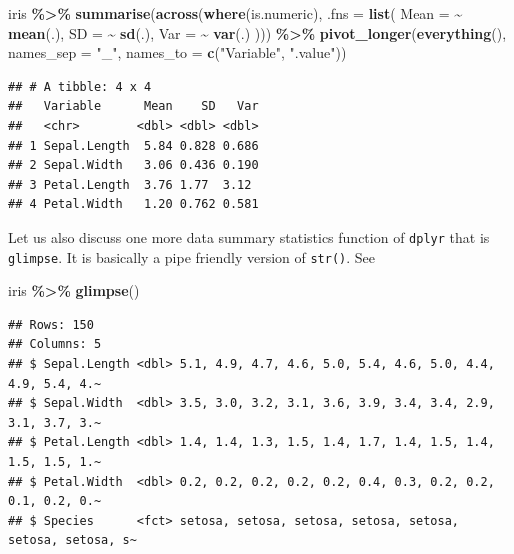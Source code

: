 \documentclass[
]{book}
\newenvironment{Shaded}{\begin{snugshade}}{\end{snugshade}}
\newcommand{\AttributeTok}[1]{\textcolor[rgb]{0.13,0.29,0.53}{#1}}
\newcommand{\FunctionTok}[1]{\textcolor[rgb]{0.13,0.29,0.53}{\textbf{#1}}}
\newcommand{\NormalTok}[1]{#1}
\newcommand{\SpecialCharTok}[1]{\textcolor[rgb]{0.81,0.36,0.00}{\textbf{#1}}}
\newcommand{\StringTok}[1]{\textcolor[rgb]{0.31,0.60,0.02}{#1}}
\begin{document}
\begin{Shaded}
\begin{Highlighting}[]
\NormalTok{iris }\SpecialCharTok{\%\textgreater{}\%}
  \FunctionTok{summarise}\NormalTok{(}\FunctionTok{across}\NormalTok{(}\FunctionTok{where}\NormalTok{(is.numeric),}
                   \AttributeTok{.fns =} \FunctionTok{list}\NormalTok{(}
                     \AttributeTok{Mean =} \SpecialCharTok{\textasciitilde{}} \FunctionTok{mean}\NormalTok{(.),}
                     \AttributeTok{SD =} \SpecialCharTok{\textasciitilde{}} \FunctionTok{sd}\NormalTok{(.),}
                     \AttributeTok{Var =} \SpecialCharTok{\textasciitilde{}} \FunctionTok{var}\NormalTok{(.)}
\NormalTok{                   ))) }\SpecialCharTok{\%\textgreater{}\%}
  \FunctionTok{pivot\_longer}\NormalTok{(}\FunctionTok{everything}\NormalTok{(),}
               \AttributeTok{names\_sep =} \StringTok{"\_"}\NormalTok{,}
               \AttributeTok{names\_to =} \FunctionTok{c}\NormalTok{(}\StringTok{"Variable"}\NormalTok{, }\StringTok{".value"}\NormalTok{))}
\end{Highlighting}
\end{Shaded}

\begin{verbatim}
## # A tibble: 4 x 4
##   Variable      Mean    SD   Var
##   <chr>        <dbl> <dbl> <dbl>
## 1 Sepal.Length  5.84 0.828 0.686
## 2 Sepal.Width   3.06 0.436 0.190
## 3 Petal.Length  3.76 1.77  3.12 
## 4 Petal.Width   1.20 0.762 0.581
\end{verbatim}

Let us also discuss one more data summary statistics function of \texttt{dplyr} that is \texttt{glimpse}. It is basically a pipe friendly version of \texttt{str()}. See

\begin{Shaded}
\begin{Highlighting}[]
\NormalTok{iris }\SpecialCharTok{\%\textgreater{}\%} 
  \FunctionTok{glimpse}\NormalTok{()}
\end{Highlighting}
\end{Shaded}

\begin{verbatim}
## Rows: 150
## Columns: 5
## $ Sepal.Length <dbl> 5.1, 4.9, 4.7, 4.6, 5.0, 5.4, 4.6, 5.0, 4.4, 4.9, 5.4, 4.~
## $ Sepal.Width  <dbl> 3.5, 3.0, 3.2, 3.1, 3.6, 3.9, 3.4, 3.4, 2.9, 3.1, 3.7, 3.~
## $ Petal.Length <dbl> 1.4, 1.4, 1.3, 1.5, 1.4, 1.7, 1.4, 1.5, 1.4, 1.5, 1.5, 1.~
## $ Petal.Width  <dbl> 0.2, 0.2, 0.2, 0.2, 0.2, 0.4, 0.3, 0.2, 0.2, 0.1, 0.2, 0.~
## $ Species      <fct> setosa, setosa, setosa, setosa, setosa, setosa, setosa, s~
\end{verbatim}
\end{document}
